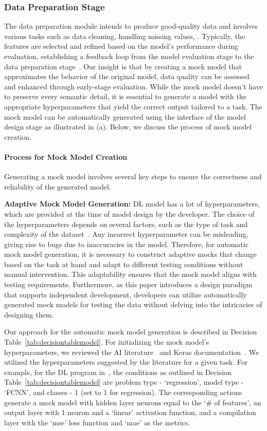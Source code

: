 \subsubsection{Data Preparation Stage}
The data preparation module intends to produce good-quality data and involves various tasks such as 
data cleaning, handling missing values, \etc. 
Typically, the features are selected and refined based on the model's performance during evaluation, establishing a feedback loop from the model evaluation stage to the data preparation stage~\cite{biswas22art}.
Our insight is that by creating a mock model that approximates the behavior of the original model, data quality can be assessed and enhanced through early-stage evaluation.
While the mock model doesn't have to preserve every semantic detail, 
it is essential to generate a model with the appropriate hyperparameters that yield the correct output tailored to a task.
The mock model can be automatically generated using the interface of the model design stage
as illustrated in (a). 
Below, we discuss the process of mock model creation.


\paragraph{Process for Mock Model Creation} Generating a mock model involves several key steps to ensure the correctness and reliability of the generated model.

\textbf{Adaptive Mock Model Generation:} DL model has a lot of hyperparameters, which are provided at the time of model design by the developer.
The choice of the hyperparameters depends on several factors, such as the type of task and complexity of the dataset~\cite{yu2020hyper,LeCun98LeNet5}.
Any incorrect hyperparameter can be misleading, giving rise to bugs due to inaccuracies in the model.
Therefore, for automatic mock model generation,
it is necessary to construct adaptive mocks that change based on the task at hand and adapt to different testing conditions without manual intervention.
This adaptability ensures that the mock model aligns with testing requirements. Furthermore, as this paper introduces a design paradigm that supports independent development, developers can utilize automatically generated mock models for testing the data without delving into the intricacies of designing them.

Our approach for the automatic mock model generation is described in Decision Table~\ref{tab:decisiontablemodel}.
For initializing the mock model's hyperparameters, we reviewed the AI literature~\cite{Krizhevsky12AlexNet,lecun2002efficient,bengio2012practical} and Keras documentation~\cite{Kerasloss}. 
We utilized the hyperparameters suggested by the literature for a given task.
For example, for the DL program  in~, the conditions as outlined in Decision Table~\ref{tab:decisiontablemodel} are problem type - `regression', model type - `FCNN', and classes - 1 (set to 1 for regression). The corresponding actions generate a mock model with hidden layer neurons equal to the `\# of features', an output layer with 1 neuron and a `linear' activation function, and a compilation layer with the `mse' loss function and `mae' as the metrics.


